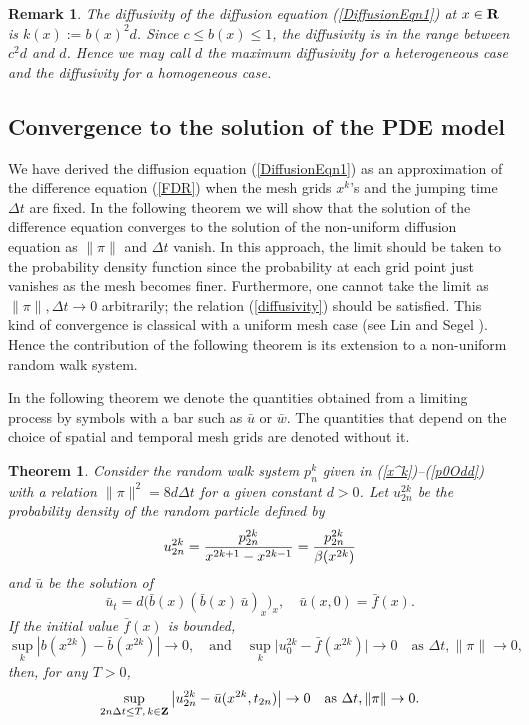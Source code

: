 \documentclass[11pt]{amsart}
\def\R{{\bf R}}
\def\d{d}
\def\R{{\bf R}}
\def\Z{{\bf Z}}
\newtheorem{theorem}{Theorem}[section]
\newtheorem{remark}{Remark}[section]
\begin{document}
\begin{remark}
The diffusivity of the diffusion equation (\ref{DiffusionEqn1}) at $x\in\R$ is $k(x):=b(x)^2\d$. Since $c\le b(x)\le1$, the diffusivity is in the range between $c^2\d$ and $\d$. Hence we may call $\d$ the maximum diffusivity for a heterogeneous case and the diffusivity for a homogeneous case.
\end{remark}



\subsection{Convergence to the solution of the PDE model}

We have derived the diffusion equation (\ref{DiffusionEqn1}) as an approximation of the difference equation (\ref{FDR}) when the mesh grids $x^k$'s and the jumping time $\Delta t$ are fixed. In the following theorem we will show that the solution of the difference equation converges to the solution of the non-uniform diffusion equation as $\|\pi\|$ and $\Delta t$ vanish. In this approach, the limit should be taken to the probability density function since the probability at each grid point just vanishes as the mesh becomes finer. Furthermore, one cannot take the limit as $\|\pi\|,\Delta t\to0$ arbitrarily; the relation (\ref{diffusivity}) should be satisfied. This kind of convergence is classical with a uniform mesh case (see Lin and Segel \cite[Section 3.3]{MR982711}). Hence the contribution of the following theorem is its extension to a non-uniform random walk system.

In the following theorem we denote the quantities obtained from a limiting process by symbols with a bar such as $\bar u$ or $\bar w$. The quantities that depend on the choice of spatial and temporal mesh grids are denoted without it.
\begin{theorem}\label{thm1} Consider the random walk system $p_n^k$ given in (\ref{x^k})--(\ref{p0Odd}) with a relation $\|\pi\|^2=8\d\Delta t$ for a given constant $\d>0$. Let $u_{2n}^{2k}$ be the probability density of the random particle defined by
$$
u_{2n}^{2k}={p_{2n}^{2k}\over x^{2k+1}-x^{2k-1}}={p_{2n}^{2k}\over\beta(x^{2k})}
$$
and $\bar u$ be the solution of
\begin{equation}\label{DiffusionEqn2}
\bar u_t=\d\big(\bar b(x) (\bar b(x)\,\bar u)_x \big)_x,\quad\bar u(x,0)=\bar f(x).
\end{equation}
If the initial value $\bar f(x)$ is bounded,
\begin{equation}\label{Assumptions}
\sup_k | b(x^{2k})-\bar b(x^{2k}) | \to 0, \quad\text{and}\quad
\sup_k \Big| u^{2k}_0 -\bar f(x^{2k}) \Big| \to 0 \quad \text{as $\Delta t,\|\pi\|\to 0$,}
\end{equation}
then, for any $T>0$,
\[
\sup_{2n\Delta t\leq T,\,k\in\Z} \big| u^{2k}_{2n} - \bar u(x^{2k},t_{2n}) \big| \to 0 \quad \text{as $\Delta t, \|\pi\| \to 0.$}
\]
\end{theorem}
\end{document}
